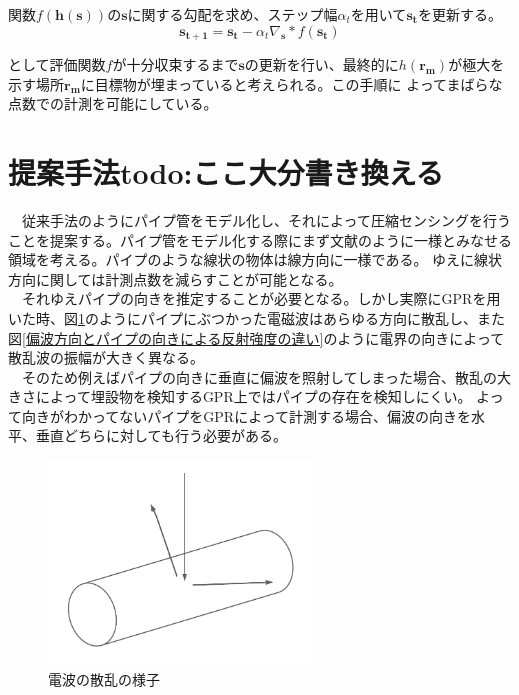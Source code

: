 \documentclass[12pt,a4paper]{jsreport}
\begin{document}
関数$f(\bm{h({\bm{s}})})$の$\bm{s}$に関する勾配を求め、ステップ幅$\alpha_{t}$を用いて$\bm{s_{t}}$を更新する。
\begin{equation}
  \bm{s_{t+1}}=\bm{s_{t}}-\alpha_{t}\nabla_{\bm{s}}*f(\bm{s_{t}})
  \end{equation}

として評価関数$f$が十分収束するまで$\bm{s}$の更新を行い、最終的に$h(\bm{r_{m}})$が極大を示す場所$\bm{r_{m}}$に目標物が埋まっていると考えられる。この手順に
よってまばらな点数での計測を可能にしている。



\section{提案手法todo:ここ大分書き換える}
　従来手法のようにパイプ管をモデル化し、それによって圧縮センシングを行うことを提案する。パイプ管をモデル化する際にまず文献\cite{imai}のように一様とみなせる領域を考える。パイプのような線状の物体は線方向に一様である。
ゆえに線状方向に関しては計測点数を減らすことが可能となる。
\\　それゆえパイプの向きを推定することが必要となる。しかし実際にGPRを用いた時、図\ref{電波の散乱の様子}のようにパイプにぶつかった電磁波はあらゆる方向に散乱し、また
図\ref{偏波方向とパイプの向きによる反射強度の違い}のように電界の向きによって散乱波の振幅が大きく異なる。
\\　そのため例えばパイプの向きに垂直に偏波を照射してしまった場合、散乱の大きさによって埋設物を検知するGPR上ではパイプの存在を検知しにくい。
よって向きがわかってないパイプをGPRによって計測する場合、偏波の向きを水平、垂直どちらに対しても行う必要がある。

\begin{figure}[h]
  \begin{center}
   \includegraphics[width=7cm]{./image/scattering.pdf}
  \caption{電波の散乱の様子}\label{電波の散乱の様子}
  \end{center}
  \end{figure}
\end{document}
